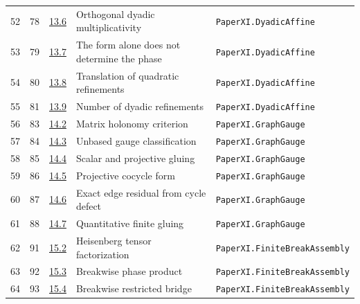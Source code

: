 \documentclass[10pt,oneside]{book}
\begin{document}
\begin{longtable}{@{}p{}p{}p{}>{\raggedright\arraybackslash}p{}p{}@{}}
52&78&\href{https://komorebi.invalid/b06/obligation_52}{13.6}&Orthogonal dyadic multiplicativity&\nolinkurl{PaperXI.DyadicAffine}\\

53&79&\href{https://komorebi.invalid/b06/obligation_53}{13.7}&The form alone does not determine the phase&\nolinkurl{PaperXI.DyadicAffine}\\

54&80&\href{https://komorebi.invalid/b06/obligation_54}{13.8}&Translation of quadratic refinements&\nolinkurl{PaperXI.DyadicAffine}\\

55&81&\href{https://komorebi.invalid/b06/obligation_55}{13.9}&Number of dyadic refinements&\nolinkurl{PaperXI.DyadicAffine}\\

56&83&\href{https://komorebi.invalid/b06/obligation_56}{14.2}&Matrix holonomy criterion&\nolinkurl{PaperXI.GraphGauge}\\

57&84&\href{https://komorebi.invalid/b06/obligation_57}{14.3}&Unbased gauge classification&\nolinkurl{PaperXI.GraphGauge}\\

58&85&\href{https://komorebi.invalid/b06/obligation_58}{14.4}&Scalar and projective gluing&\nolinkurl{PaperXI.GraphGauge}\\

59&86&\href{https://komorebi.invalid/b06/obligation_59}{14.5}&Projective cocycle form&\nolinkurl{PaperXI.GraphGauge}\\

60&87&\href{https://komorebi.invalid/b06/obligation_60}{14.6}&Exact edge residual from cycle defect&\nolinkurl{PaperXI.GraphGauge}\\

61&88&\href{https://komorebi.invalid/b06/obligation_61}{14.7}&Quantitative finite gluing&\nolinkurl{PaperXI.GraphGauge}\\

62&91&\href{https://komorebi.invalid/b06/obligation_62}{15.2}&Heisenberg tensor factorization&\nolinkurl{PaperXI.FiniteBreakAssembly}\\

63&92&\href{https://komorebi.invalid/b06/obligation_63}{15.3}&Breakwise phase product&\nolinkurl{PaperXI.FiniteBreakAssembly}\\

64&93&\href{https://komorebi.invalid/b06/obligation_64}{15.4}&Breakwise restricted bridge&\nolinkurl{PaperXI.FiniteBreakAssembly}\\


\end{longtable}
\end{document}
